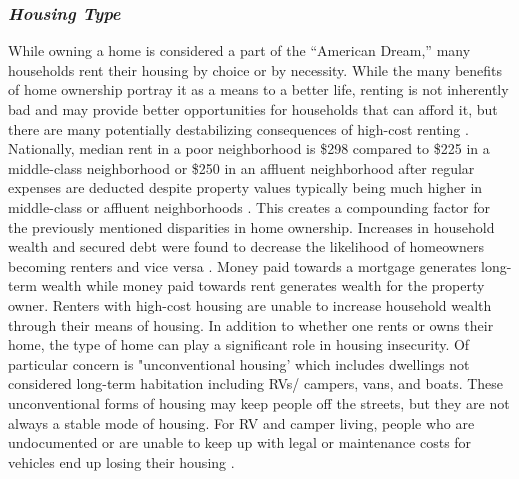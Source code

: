 \subsubsection{\textit{Housing Type}} 
While owning a home is considered a part of the “American Dream,” many households rent their housing by choice or by necessity. While the many benefits of home ownership portray it as a means to a better life, renting is not inherently bad and may provide better opportunities for households that can afford it, but there are many potentially destabilizing consequences of high-cost renting \citep{drew_believing_2014}. Nationally, median rent in a poor neighborhood is \$298 compared to \$225 in a middle-class neighborhood or \$250 in an affluent neighborhood after regular expenses are deducted despite property values typically being much higher in middle-class or affluent neighborhoods \citep{desmond_poor_2019}. This creates a compounding factor for the previously mentioned disparities in home ownership. Increases in household wealth and secured debt were found to decrease the likelihood of homeowners becoming renters and vice versa \citep{anderson_effect_2021}. Money paid towards a mortgage generates long-term wealth while money paid towards rent generates wealth for the property owner. Renters with high-cost housing are unable to increase household wealth through their means of housing.  In addition to whether one rents or owns their home, the type of home can play a significant role in housing insecurity. Of particular concern is "unconventional housing' which includes dwellings not considered long-term habitation including RVs/ campers, vans, and boats. These unconventional forms of housing may keep people off the streets, but they are not always a stable mode of housing. For RV and camper living, people who are undocumented or are unable to keep up with legal or maintenance costs for vehicles end up losing their housing \citep{wakin_not_2005}. 


